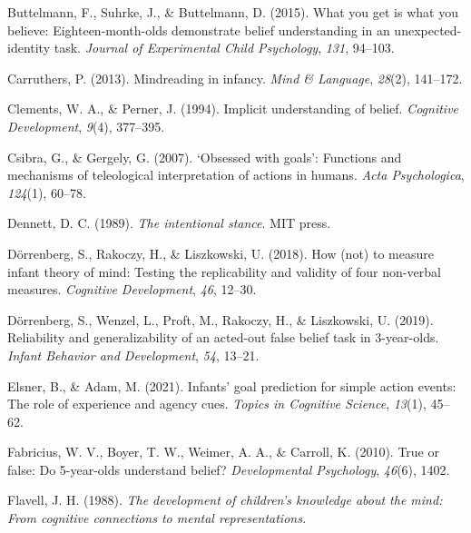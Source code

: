 \documentclass[
  english,
  man,floatsintext]{apa6}
\newlength{\cslhangindent}
\newlength{\cslentryspacingunit} %
\newenvironment{CSLReferences}[2] %
 {%
  \setlength{\parindent}{0pt}
  \ifodd #1
  \let\oldpar\par
  \def\par{\hangindent=\cslhangindent\oldpar}
  \fi
  \setlength{\parskip}{#2\cslentryspacingunit}
 }%
 {}
\begin{document}
\begin{CSLReferences}{1}{0}
\leavevmode{}%
Buttelmann, F., Suhrke, J., \& Buttelmann, D. (2015). What you get is what you believe: Eighteen-month-olds demonstrate belief understanding in an unexpected-identity task. \emph{Journal of Experimental Child Psychology}, \emph{131}, 94--103.

\leavevmode{}%
Carruthers, P. (2013). Mindreading in infancy. \emph{Mind \& Language}, \emph{28}(2), 141--172.

\leavevmode{}%
Clements, W. A., \& Perner, J. (1994). Implicit understanding of belief. \emph{Cognitive Development}, \emph{9}(4), 377--395.

\leavevmode{}%
Csibra, G., \& Gergely, G. (2007). {`Obsessed with goals'}: Functions and mechanisms of teleological interpretation of actions in humans. \emph{Acta Psychologica}, \emph{124}(1), 60--78.

\leavevmode{}%
Dennett, D. C. (1989). \emph{The intentional stance}. MIT press.

\leavevmode{}%
Dörrenberg, S., Rakoczy, H., \& Liszkowski, U. (2018). How (not) to measure infant theory of mind: Testing the replicability and validity of four non-verbal measures. \emph{Cognitive Development}, \emph{46}, 12--30.

\leavevmode{}%
Dörrenberg, S., Wenzel, L., Proft, M., Rakoczy, H., \& Liszkowski, U. (2019). Reliability and generalizability of an acted-out false belief task in 3-year-olds. \emph{Infant Behavior and Development}, \emph{54}, 13--21.

\leavevmode{}%
Elsner, B., \& Adam, M. (2021). Infants' goal prediction for simple action events: The role of experience and agency cues. \emph{Topics in Cognitive Science}, \emph{13}(1), 45--62.

\leavevmode{}%
Fabricius, W. V., Boyer, T. W., Weimer, A. A., \& Carroll, K. (2010). True or false: Do 5-year-olds understand belief? \emph{Developmental Psychology}, \emph{46}(6), 1402.

\leavevmode{}%
Flavell, J. H. (1988). \emph{The development of children's knowledge about the mind: From cognitive connections to mental representations.}


\end{CSLReferences}
\end{document}
